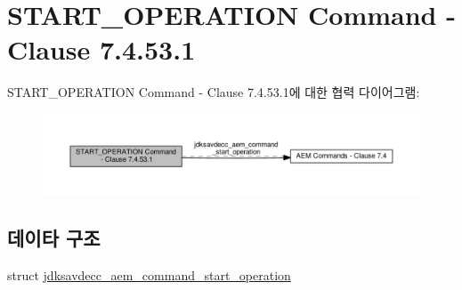 \hypertarget{group__command__start__operation}{}\section{S\+T\+A\+R\+T\+\_\+\+O\+P\+E\+R\+A\+T\+I\+ON Command -\/ Clause 7.4.53.1}
\label{group__command__start__operation}
S\+T\+A\+R\+T\+\_\+\+O\+P\+E\+R\+A\+T\+I\+ON Command -\/ Clause 7.4.53.1에 대한 협력 다이어그램\+:
\nopagebreak
\begin{figure}[H]
\begin{center}
\leavevmode
\includegraphics[width=350pt]{group__command__start__operation}
\end{center}
\end{figure}
\subsection*{데이타 구조}
\begin{DoxyCompactItemize}
\item 
struct \hyperlink{structjdksavdecc__aem__command__start__operation}{jdksavdecc\+\_\+aem\+\_\+command\+\_\+start\+\_\+operation}
\end{DoxyCompactItemize}

